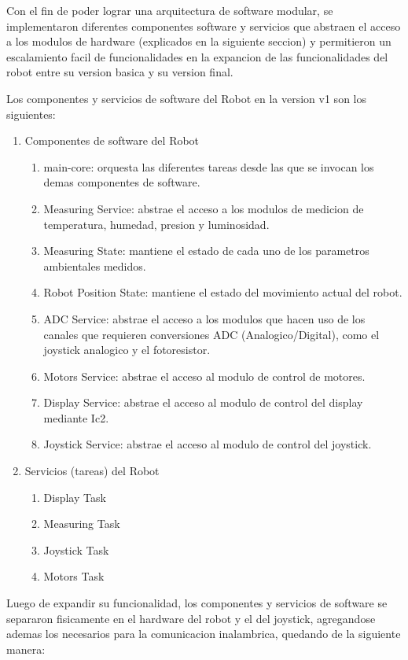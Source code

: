 Con el fin de poder lograr una arquitectura de software modular, se implementaron diferentes componentes software y servicios que abstraen el acceso a los modulos de hardware (explicados en la siguiente seccion) y permitieron un escalamiento facil de funcionalidades en la expancion de las funcionalidades del robot entre su version basica y su version final.

Los componentes y servicios de software del Robot en la version v1 son los siguientes:

\begin{enumerate}	
	\item Componentes de software del Robot
	\begin{enumerate}			
		\item main-core: orquesta las diferentes tareas desde las que se invocan los demas componentes de software.
		\item Measuring Service: abstrae el acceso a los modulos de medicion de temperatura, humedad, presion y luminosidad.
		\item Measuring State: mantiene el estado de cada uno de los parametros ambientales medidos.
		\item Robot Position State: mantiene el estado del movimiento actual del robot.
		\item ADC Service: abstrae el acceso a los modulos que hacen uso de los canales que requieren conversiones ADC (Analogico/Digital), como el joystick analogico y el fotoresistor. 
		\item Motors Service: abstrae el acceso al modulo de control de motores.
		\item Display Service: abstrae el acceso al modulo de control del display mediante Ic2.
		\item Joystick Service: abstrae el acceso al modulo de control del joystick.
	\end{enumerate}	
	\item Servicios (tareas) del Robot
	\begin{enumerate}				
		\item Display Task	
		\item Measuring Task		
		\item Joystick Task
		\item Motors Task		
	\end{enumerate}			
\end{enumerate}		


Luego de expandir su funcionalidad, los componentes y servicios de software se separaron fisicamente en el hardware del robot y el del joystick, agregandose ademas los necesarios para la comunicacion inalambrica, quedando de la siguiente manera:

